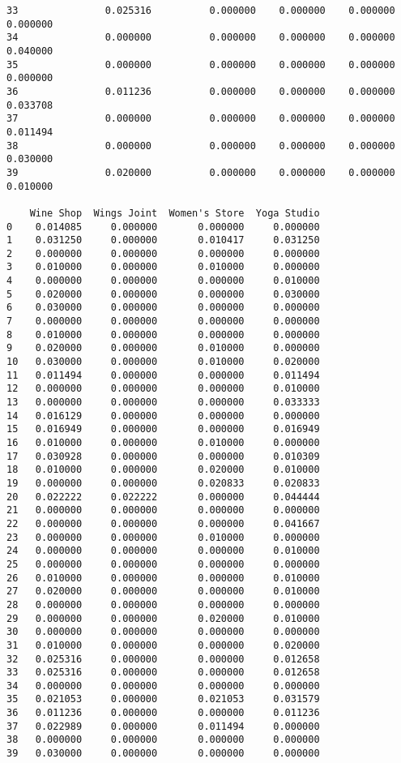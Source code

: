 \documentclass[11pt]{article}
\begin{document}
\begin{tcolorbox}[breakable, size=fbox, boxrule=.5pt, pad at break*=1mm, opacityfill=0]
\begin{Verbatim}[commandchars=\\\{\}]
33               0.025316          0.000000    0.000000    0.000000  0.000000
34               0.000000          0.000000    0.000000    0.000000  0.040000
35               0.000000          0.000000    0.000000    0.000000  0.000000
36               0.011236          0.000000    0.000000    0.000000  0.033708
37               0.000000          0.000000    0.000000    0.000000  0.011494
38               0.000000          0.000000    0.000000    0.000000  0.030000
39               0.020000          0.000000    0.000000    0.000000  0.010000

    Wine Shop  Wings Joint  Women's Store  Yoga Studio
0    0.014085     0.000000       0.000000     0.000000
1    0.031250     0.000000       0.010417     0.031250
2    0.000000     0.000000       0.000000     0.000000
3    0.010000     0.000000       0.010000     0.000000
4    0.000000     0.000000       0.000000     0.010000
5    0.020000     0.000000       0.000000     0.030000
6    0.030000     0.000000       0.000000     0.000000
7    0.000000     0.000000       0.000000     0.000000
8    0.010000     0.000000       0.000000     0.000000
9    0.020000     0.000000       0.010000     0.000000
10   0.030000     0.000000       0.010000     0.020000
11   0.011494     0.000000       0.000000     0.011494
12   0.000000     0.000000       0.000000     0.010000
13   0.000000     0.000000       0.000000     0.033333
14   0.016129     0.000000       0.000000     0.000000
15   0.016949     0.000000       0.000000     0.016949
16   0.010000     0.000000       0.010000     0.000000
17   0.030928     0.000000       0.000000     0.010309
18   0.010000     0.000000       0.020000     0.010000
19   0.000000     0.000000       0.020833     0.020833
20   0.022222     0.022222       0.000000     0.044444
21   0.000000     0.000000       0.000000     0.000000
22   0.000000     0.000000       0.000000     0.041667
23   0.000000     0.000000       0.010000     0.000000
24   0.000000     0.000000       0.000000     0.010000
25   0.000000     0.000000       0.000000     0.000000
26   0.010000     0.000000       0.000000     0.010000
27   0.020000     0.000000       0.000000     0.010000
28   0.000000     0.000000       0.000000     0.000000
29   0.000000     0.000000       0.020000     0.010000
30   0.000000     0.000000       0.000000     0.000000
31   0.010000     0.000000       0.000000     0.020000
32   0.025316     0.000000       0.000000     0.012658
33   0.025316     0.000000       0.000000     0.012658
34   0.000000     0.000000       0.000000     0.000000
35   0.021053     0.000000       0.021053     0.031579
36   0.011236     0.000000       0.000000     0.011236
37   0.022989     0.000000       0.011494     0.000000
38   0.000000     0.000000       0.000000     0.000000
39   0.030000     0.000000       0.000000     0.000000
\end{Verbatim}
\end{tcolorbox}
        
\end{document}
